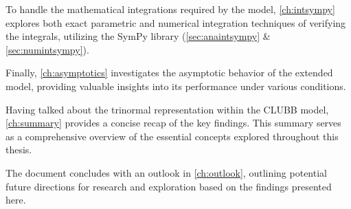 To handle the mathematical integrations required by the model,
\cref{ch:intsympy} explores both exact parametric
and numerical integration techniques of verifying the integrals,
utilizing the SymPy library (\cref{sec:anaintsympy} \& \cref{sec:numintsympy}).

Finally,
\cref{ch:asymptotics} investigates the asymptotic behavior of the extended model,
providing valuable insights into its performance under various conditions.

Having talked about the trinormal representation within the \gls{CLUBB} model,
\cref{ch:summary} provides a concise recap of the key findings.
This summary serves as a comprehensive overview of the essential concepts
explored throughout this thesis.

The document concludes with an outlook in \cref{ch:outlook},
outlining potential future directions for research
and exploration based on the findings presented here.
